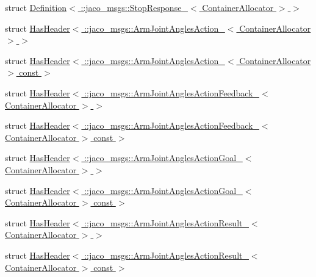 \begin{DoxyCompactItemize}
struct \hyperlink{structros_1_1message__traits_1_1Definition_3_01_1_1jaco__msgs_1_1StopResponse___3_01ContainerAllocator_01_4_01_4}{Definition$<$ \+::jaco\+\_\+msgs\+::\+Stop\+Response\+\_\+$<$ Container\+Allocator $>$ $>$}
\item 
struct \hyperlink{structros_1_1message__traits_1_1HasHeader_3_01_1_1jaco__msgs_1_1ArmJointAnglesAction___3_01ContainerAllocator_01_4_01_4}{Has\+Header$<$ \+::jaco\+\_\+msgs\+::\+Arm\+Joint\+Angles\+Action\+\_\+$<$ Container\+Allocator $>$ $>$}
\item 
struct \hyperlink{structros_1_1message__traits_1_1HasHeader_3_01_1_1jaco__msgs_1_1ArmJointAnglesAction___3_01Conta732f619fa6ccbdcb964fc4e64079b1f1}{Has\+Header$<$ \+::jaco\+\_\+msgs\+::\+Arm\+Joint\+Angles\+Action\+\_\+$<$ Container\+Allocator $>$ const  $>$}
\item 
struct \hyperlink{structros_1_1message__traits_1_1HasHeader_3_01_1_1jaco__msgs_1_1ArmJointAnglesActionFeedback___3_01ContainerAllocator_01_4_01_4}{Has\+Header$<$ \+::jaco\+\_\+msgs\+::\+Arm\+Joint\+Angles\+Action\+Feedback\+\_\+$<$ Container\+Allocator $>$ $>$}
\item 
struct \hyperlink{structros_1_1message__traits_1_1HasHeader_3_01_1_1jaco__msgs_1_1ArmJointAnglesActionFeedback___3ea4b132f08c9f6fe132b88a8c1bf50f3}{Has\+Header$<$ \+::jaco\+\_\+msgs\+::\+Arm\+Joint\+Angles\+Action\+Feedback\+\_\+$<$ Container\+Allocator $>$ const  $>$}
\item 
struct \hyperlink{structros_1_1message__traits_1_1HasHeader_3_01_1_1jaco__msgs_1_1ArmJointAnglesActionGoal___3_01ContainerAllocator_01_4_01_4}{Has\+Header$<$ \+::jaco\+\_\+msgs\+::\+Arm\+Joint\+Angles\+Action\+Goal\+\_\+$<$ Container\+Allocator $>$ $>$}
\item 
struct \hyperlink{structros_1_1message__traits_1_1HasHeader_3_01_1_1jaco__msgs_1_1ArmJointAnglesActionGoal___3_01C197b71b1189dba81027cae61f5b2bcfe}{Has\+Header$<$ \+::jaco\+\_\+msgs\+::\+Arm\+Joint\+Angles\+Action\+Goal\+\_\+$<$ Container\+Allocator $>$ const  $>$}
\item 
struct \hyperlink{structros_1_1message__traits_1_1HasHeader_3_01_1_1jaco__msgs_1_1ArmJointAnglesActionResult___3_01ContainerAllocator_01_4_01_4}{Has\+Header$<$ \+::jaco\+\_\+msgs\+::\+Arm\+Joint\+Angles\+Action\+Result\+\_\+$<$ Container\+Allocator $>$ $>$}
\item 
struct \hyperlink{structros_1_1message__traits_1_1HasHeader_3_01_1_1jaco__msgs_1_1ArmJointAnglesActionResult___3_07fa74239b737d4dd65345cc016c585a0}{Has\+Header$<$ \+::jaco\+\_\+msgs\+::\+Arm\+Joint\+Angles\+Action\+Result\+\_\+$<$ Container\+Allocator $>$ const  $>$}

\end{DoxyCompactItemize}
